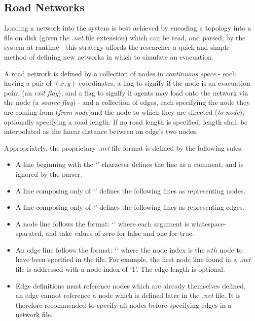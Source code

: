 \subsection{Road Networks}
Loading a network into the system is best achieved by encoding a topology into a file on disk (given the \textit{.net} file extension) which can be read, and parsed, by the system at runtime - this strategy affords the researcher a quick and simple method of defining new networks in which to simulate an evacuation.

A road network is defined by a collection of nodes in \textit{continuous space} - each having a pair of $(x,y)$ coordinates, a flag to signify if the node is an evacuation point (an \textit{exit flag}), and a flag to signify if agents may load onto the network via the node (a \textit{source flag}) - and a collection of edges, each specifying the node they are coming from (\textit{from node})and the node to which they are directed (\textit{to node}), optionally specifying a road length. If no road length is specified, length shall be interpolated as the linear distance between an edge's two nodes.

Appropriately, the proprietary \textit{.net} file format is defined by the following rules:
\begin{itemize}
    \item A line beginning with the `\code{\#}' character defines the line as a comment, and is ignored by the parser.
    \item A line composing only of `' defines the following lines as representing nodes.
    \item A line composing only of `' defines the following lines as representing edges.
    \item A node line follows the format:
    `'
    where each argument is whitespace-sparated,  and \newline{} take values of zero for false and one for true.
    \item  An edge line follows the format:
    `'
    where the node index is the $nth$ node to have been specified in the file. For example, the first node line found in a \textit{.net} file is addressed with a node index of `$1$'. The edge length is optional.
    \item Edge definitions must reference nodes which are already themselves defined, an edge cannot reference a node which is defined later in the \textit{.net} file. It is therefore recommended to specify all nodes before specifying edges in a network file.
\end{itemize}

